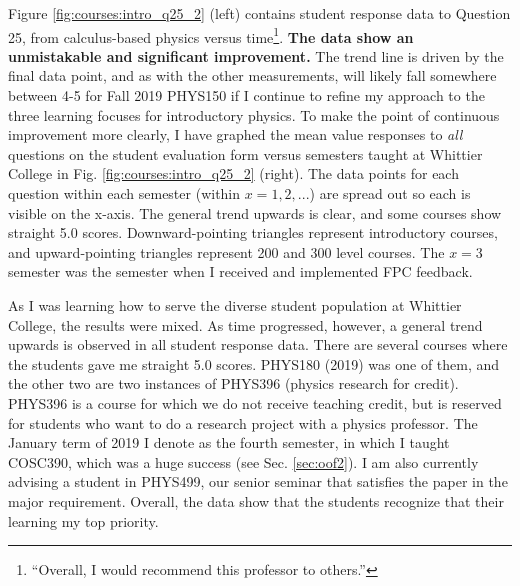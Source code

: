 \documentclass[../../main.tex]{subfiles}
\begin{document}
Figure \ref{fig:courses:intro_q25_2} (left) contains student response data to Question 25, from calculus-based physics versus time\footnote{``Overall, I would recommend this professor to others.''}.  \textbf{The data show an unmistakable and significant improvement.}  The trend line is driven by the final data point, and as with the other measurements, will likely fall somewhere between 4-5 for Fall 2019 PHYS150 if I continue to refine my approach to the three learning focuses for introductory physics.  To make the point of continuous improvement more clearly, I have graphed the mean value responses to \textit{all} questions on the student evaluation form versus semesters taught at Whittier College in Fig. \ref{fig:courses:intro_q25_2} (right).  The data points for each question within each semester (within $x=1,2,...$) are spread out so each is visible on the x-axis.  The general trend upwards is clear, and some courses show straight 5.0 scores.  Downward-pointing triangles represent introductory courses, and upward-pointing triangles represent 200 and 300 level courses.  The $x=3$ semester was the semester when I received and implemented FPC feedback.  \\ \hspace{0.1cm}

As I was learning how to serve the diverse student population at Whittier College, the results were mixed.  As time progressed, however, a general trend upwards is observed in all student response data.  There are several courses where the students gave me straight 5.0 scores.  PHYS180 (2019) was one of them, and the other two are two instances of PHYS396 (physics research for credit).  PHYS396 is a course for which we do not receive teaching credit, but is reserved for students who want to do a research project with a physics professor.  The January term of 2019 I denote as the fourth semester, in which I taught COSC390, which was a huge success (see Sec. \ref{sec:oof2}).  I am also currently advising a student in PHYS499, our senior seminar that satisfies the paper in the major requirement.  Overall, the data show that the students recognize that their learning my top priority.  \\ \hspace{0.1cm}
\end{document}
